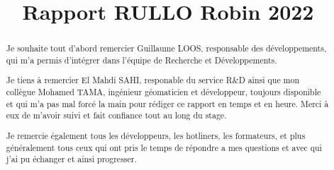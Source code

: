 \documentclass{rapportUHA40}
\title{Rapport RULLO Robin 2022} %
\begin{document}









\fairepagedegarde%
\fairemarges%



\begin{center}
  \begin{abstract}
    Je souhaite tout d’abord remercier Guillaume LOOS, responsable des
    développements, qui m'a permis d'intégrer dans l'équipe de Recherche et Développements.
    \vspace{1cm}

    Je tiens à remercier El Mahdi SAHI, responable du service R\&D ainsi que mon
    collègue Mohamed TAMA, ingénieur géomaticien et développeur, toujours
    disponible et qui m'a pas mal forcé la main pour rédiger ce rapport en temps et
    en heure. Merci à eux de m’avoir suivi et fait confiance tout au long du stage.
    \vspace{1cm}

    Je remercie également tous les développeurs, les hotliners, les formateurs, et
    plus généralement tous ceux qui ont pris le temps de répondre a mes questions
    et avec qui j'ai pu échanger et ainsi progresser.
  \end{abstract}
\end{center}
\newpage
\end{document}
